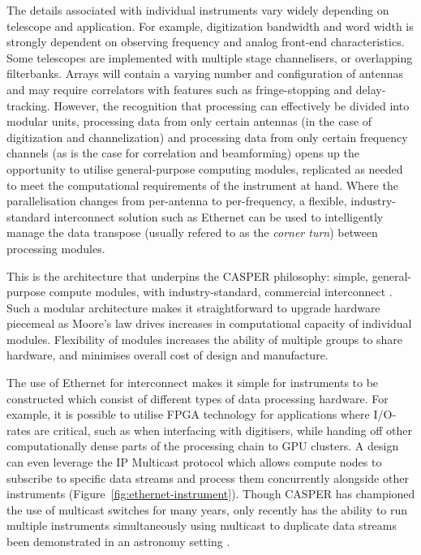 \documentclass{ws-jai}
\begin{document}
The details associated with individual instruments vary widely depending
on telescope and application. For example, digitization bandwidth and word width
is strongly dependent on observing frequency and analog front-end
characteristics. Some telescopes are implemented with
multiple stage channelisers, or overlapping filterbanks. Arrays will contain a varying number and configuration of antennas and may require correlators with features such as fringe-stopping and delay-tracking.
However, the recognition that
processing can effectively be divided into modular units, processing data
from only certain antennas (in the case of digitization and channelization) and
 processing data from only certain frequency channels (as is the case for
correlation and beamforming) opens up the opportunity to utilise
general-purpose computing modules, replicated as needed to meet the computational
requirements of the instrument at hand. Where the parallelisation changes from
per-antenna to per-frequency, a flexible, industry-standard interconnect
solution such as Ethernet can be used to intelligently manage the
data transpose (usually refered to as the \emph{corner turn}) between
processing modules.

This is the architecture that underpins the CASPER philosophy: simple,
general-purpose compute modules, with industry-standard, commercial
interconnect \citep{parsons-petaop, parsons2008scalable, pars05}. Such a modular architecture makes it straightforward to upgrade hardware
piecemeal as Moore's law drives increases in computational capacity of
individual modules. Flexibility of modules increases the ability of multiple
groups to share hardware, and minimises overall cost of design and manufacture.

The use of Ethernet for interconnect makes it simple for instruments to be
constructed which consist of different types of data processing hardware. For example, it is possible
to utilise FPGA technology for applications where I/O-rates are critical, such
as when interfacing with digitisers, while handing off other computationally
dense parts of the processing chain to GPU clusters. A
design can even leverage the IP Multicast protocol
which allows compute nodes to subscribe to
specific data streams and process them concurrently alongside other instruments (Figure~\ref{fig:ethernet-instrument}).
Though CASPER has championed the use of multicast switches for many years, only recently has the ability to run multiple instruments simultaneously using multicast to duplicate data streams been demonstrated in an astronomy setting \citep{man14}. 
\end{document}
